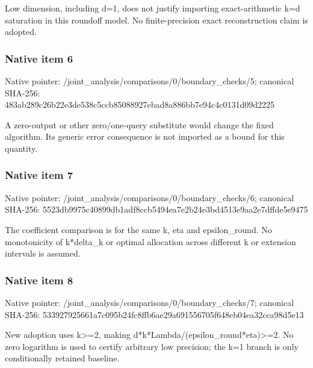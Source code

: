 \documentclass[10pt,a4paper]{article}
\begin{document}
\begingroup\raggedright\sloppy Low dimension,\allowbreak{} including d=\allowbreak{}1,\allowbreak{} does not justify importing exact-arithmetic k=\allowbreak{}d saturation in this roundoff model. No finite-precision exact reconstruction claim is adopted.\par\endgroup

\subsubsection{Native item 6}
Native pointer: /joint\_\allowbreak{}analysis/comparisons/0/boundary\_\allowbreak{}checks/5; canonical SHA-256: 483ab289c26b22e3de538c5ccb85088927ebad8a886bb7e94c4c0131d09d2225

\begingroup\raggedright\sloppy A zero-output or other zero/\allowbreak{}one-query substitute would change the fixed algorithm. Its generic error consequence is not imported as a bound for this quantity.\par\endgroup

\subsubsection{Native item 7}
Native pointer: /joint\_\allowbreak{}analysis/comparisons/0/boundary\_\allowbreak{}checks/6; canonical SHA-256: 5523db9975c40899db1adf8ccb5494ea7e2b24e3bd4513e9aa2e7dffde5e9475

\begingroup\raggedright\sloppy The coefficient comparison is for the same k,\allowbreak{} eta and epsilon\_\allowbreak{}round. No monotonicity of k*delta\_\allowbreak{}k or optimal allocation across different k or extension intervals is assumed.\par\endgroup

\subsubsection{Native item 8}
Native pointer: /joint\_\allowbreak{}analysis/comparisons/0/boundary\_\allowbreak{}checks/7; canonical SHA-256: 533927925661a7c095b24fc8ffb6ae29a691556705f648eb04ea32cca98d5e13

\begingroup\raggedright\sloppy New adoption uses k>=\allowbreak{}2,\allowbreak{} making d*k*Lambda/\allowbreak{}(epsilon\_\allowbreak{}round*eta)>=\allowbreak{}2. No zero logarithm is used to certify arbitrary low precision;\allowbreak{} the k=\allowbreak{}1 branch is only conditionally retained baseline.\par\endgroup
\end{document}
